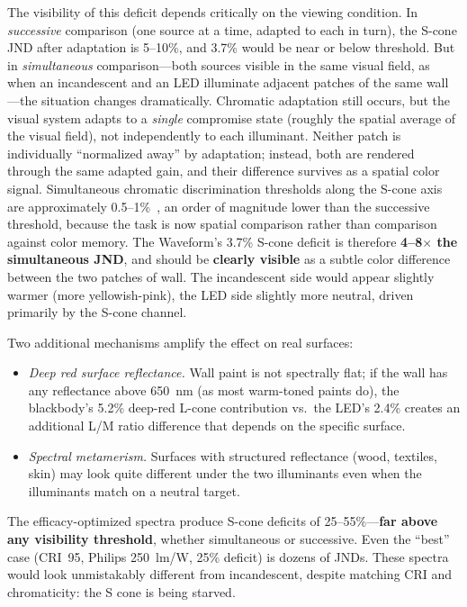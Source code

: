 \documentclass[11pt]{article}
\begin{document}
The visibility of this deficit depends critically on the viewing
condition.  In \emph{successive} comparison (one source at a time,
adapted to each in turn), the S-cone JND after adaptation is 5--10\%,
and 3.7\% would be near or below threshold.  But in \emph{simultaneous} comparison---both sources visible in the
same visual field, as when an incandescent and an LED illuminate
adjacent patches of the same wall---the situation changes dramatically.
Chromatic adaptation still occurs, but the visual system adapts to a
\emph{single} compromise state (roughly the spatial average of the
visual field), not independently to each illuminant.  Neither patch is
individually ``normalized away'' by adaptation; instead, both are
rendered through the same adapted gain, and their difference survives
as a spatial color signal.  Simultaneous chromatic discrimination
thresholds along the S-cone axis are approximately
0.5--1\%~\cite{krauskopf1992}, an order of magnitude lower than the
successive threshold, because the task is now spatial comparison rather
than comparison against color memory.  The Waveform's 3.7\% S-cone
deficit is therefore \textbf{4--8$\times$ the simultaneous JND}, and
should be \textbf{clearly visible} as a subtle color difference between
the two patches of wall.  The incandescent side would appear slightly
warmer (more yellowish-pink), the LED side slightly more neutral,
driven primarily by the S-cone channel.

Two additional mechanisms amplify the effect on real surfaces:
\begin{itemize}
\item \emph{Deep red surface reflectance.}  Wall paint is not spectrally
  flat; if the wall has any reflectance above 650~nm (as most warm-toned
  paints do), the blackbody's 5.2\% deep-red L-cone contribution
  vs.\ the LED's 2.4\% creates an additional L/M ratio difference that
  depends on the specific surface.
\item \emph{Spectral metamerism.}  Surfaces with structured reflectance
  (wood, textiles, skin) may look quite different under the two
  illuminants even when the illuminants match on a neutral target.
\end{itemize}

The efficacy-optimized spectra produce S-cone deficits of
25--55\%---\textbf{far above any visibility threshold}, whether
simultaneous or successive.  Even the ``best'' case (CRI~95,
Philips 250~lm/W, 25\% deficit) is dozens of JNDs.  These spectra
would look unmistakably different from incandescent, despite matching
CRI and chromaticity: the S cone is being starved.
\end{document}
